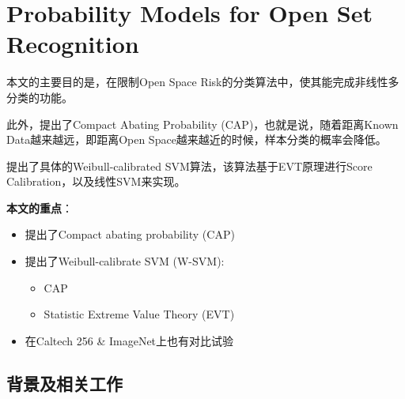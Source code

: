 \section{Probability Models for Open Set Recognition}

本文的主要目的是，在限制Open Space Risk的分类算法中，使其能完成非线性多分类的功能。

此外，提出了Compact Abating Probability (CAP)，也就是说，随着距离Known Data越来越远，即距离Open Space越来越近的时候，样本分类的概率会降低。

提出了具体的Weibull-calibrated SVM算法，该算法基于EVT原理进行Score Calibration，以及线性SVM来实现。

\textbf{本文的重点}：
\begin{itemize}
\item 提出了Compact abating probability (CAP)
\item 提出了Weibull-calibrate SVM (W-SVM):
\begin{itemize}
\item CAP
\item Statistic Extreme Value Theory (EVT)
\end{itemize}
\item 在Caltech 256 \& ImageNet上也有对比试验
\end{itemize}

\subsection{背景及相关工作}

















